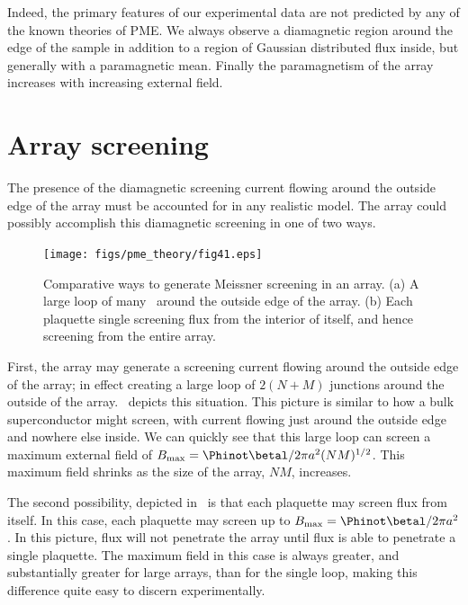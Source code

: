 Indeed, the primary features of our experimental data are not
predicted by any of the known theories of PME. We always observe a
diamagnetic region around the edge of the sample in addition to 
a region of Gaussian distributed flux inside, but generally with
a  paramagnetic mean. Finally the paramagnetism of the array increases
with increasing external field. 

\section{Array screening}

The presence of the diamagnetic screening current flowing around
the outside edge of the array must be accounted for in any 
realistic model. The array could possibly accomplish this diamagnetic
screening in one of two ways. 

\begin{figure}
\texttt{[image: figs/pme\_theory/fig41.eps]}
\caption[Comparative array screening: individual plaquette \vs\ 
large outside loop]
{Comparative ways to generate Meissner screening in an array.
(a) A large loop of many \jjsnoun\ around the outside edge of the
array. (b) Each plaquette single screening flux from the interior
of itself, and hence screening from the entire array. }
\label{fig:comp_array_screening}
\end{figure}

First, the array may generate a screening
current flowing around the outside edge of the array; in effect
creating a large loop of $2(N + M)$ junctions around the outside
of the array. 
\ depicts this situation. 
This picture is similar to how a bulk 
superconductor might screen, with current flowing just around the outside
edge and nowhere else inside. 
We can quickly see that this
large loop can screen a maximum external field of 
$B_{\mathrm{max}}=\Phinot \betal /2 \pi a^2 (NM)^{1/2}$. This
maximum field shrinks as the size of the array, $NM$, increases.

The second possibility, depicted in 
\ is that each plaquette 
may screen flux from 
itself. In this case, each plaquette may screen up to 
$B_{\mathrm{max}} = \Phinot \betal /2 \pi a^2$. 
In this picture, flux will not penetrate the array until flux
is able to penetrate a single plaquette. The maximum
field in this case is always greater, and substantially greater
for large arrays, than for the single loop, making this difference
quite easy to discern experimentally. 

